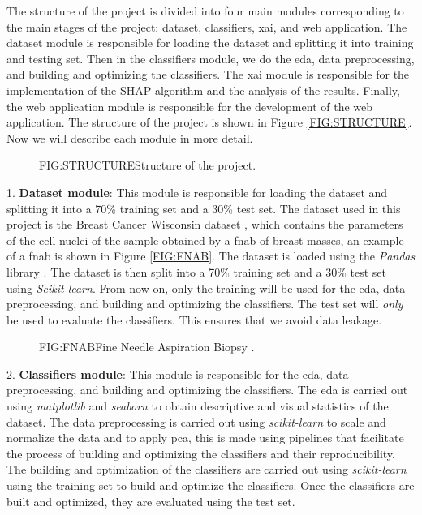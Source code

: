 
The structure of the project is divided into four main modules corresponding to the main stages of the project: dataset, classifiers, \ac{xai}, and web application. The dataset module is responsible for loading the dataset and splitting 
it into training and testing set.
Then in the classifiers module, we do the \ac{eda}, data preprocessing, and building and optimizing the classifiers. The \ac{xai} module is responsible for the implementation of the SHAP algorithm and the analysis of the results. Finally, the web application module is responsible for the development of the web application. The structure of the project is shown in Figure \ref{FIG:STRUCTURE}. Now we will describe each module in more detail.

\begin{figure}[Structure of the project]{FIG:STRUCTURE}{Structure of the project.}
\end{figure}

1. \textbf{Dataset module}: This module is responsible for loading the dataset and splitting it into a 70\% training set and a 30\% test set. The dataset used in this project is the Breast Cancer Wisconsin dataset \cite{william_wolberg_breast_1993}, which contains the parameters of the cell nuclei of the sample obtained by a \ac{fnab} of breast masses, an example of a \ac{fnab} is shown in Figure \ref{FIG:FNAB}. The dataset is loaded using the \textit{Pandas} library \cite{team_pandas-devpandas_2020}. The dataset is then split into a 70\% training set and a 30\% test set using \textit{Scikit-learn}. From now on, only the training will be used for the \acl{eda}, data preprocessing, and building and optimizing the classifiers. The test set will \textit{only} be used to evaluate the classifiers. This ensures that we avoid data leakage. 


\begin{figure}[Fine Needle Aspiration Biopsy]{FIG:FNAB}{Fine Needle Aspiration Biopsy \cite{sidey-gibbons_machine_2019}.}
\end{figure}

2. \textbf{Classifiers module}: This module is responsible for the \ac{eda}, data preprocessing, and building and optimizing the classifiers. The \ac{eda} is carried out using \textit{matplotlib} and \textit{seaborn} to obtain descriptive and visual statistics of the dataset. The data preprocessing is carried out using \textit{scikit-learn} to scale and normalize the data and to apply \ac{pca}, this is made using pipelines that facilitate the process of building and optimizing the classifiers and their reproducibility. The building and optimization of the classifiers are carried out using \textit{scikit-learn} using the training set to build and optimize the classifiers. Once the classifiers are built and optimized, they are evaluated using the test set.

